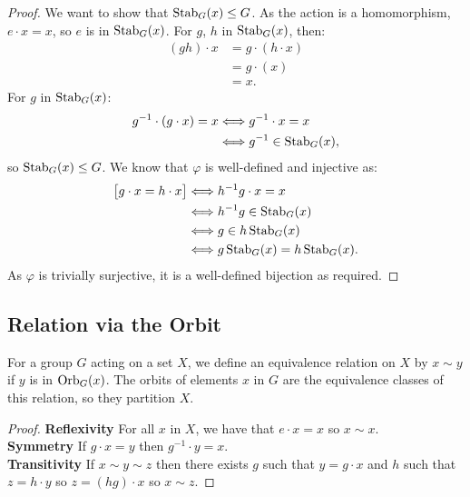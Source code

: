 \begin{proof}
    We want to show that $\operatorname{Stab}_G(x) \leq G$.
    As the action is a homomorphism, $e \cdot x = x$, so $e$ is
    in $\operatorname{Stab}_G(x)$. For $g$, $h$ in $\operatorname{Stab}_G(x)$, then: \begin{align*}
        (gh) \cdot x 
        &= g \cdot (h \cdot x) \tag{action is homomorphic} \\
        &= g \cdot (x) \\
        &= x.
    \end{align*} For $g$ in $\operatorname{Stab}_G(x)$: \begin{align*}
        g^{-1} \cdot (g \cdot x) = x
        & \Longleftrightarrow g^{-1} \cdot x = x \\
        & \Longleftrightarrow g^{-1} \in \operatorname{Stab}_G(x),
    \end{align*} so $\operatorname{Stab}_G(x) \leq G$. We know that
    $\varphi$ is well-defined and injective as: \begin{align*}
        \bigl[ g \cdot x = h \cdot x \bigr]
        & \Longleftrightarrow h^{-1}g \cdot x = x \\
        & \Longleftrightarrow h^{-1}g \in \operatorname{Stab}_G(x) \\
        & \Longleftrightarrow g \in h\operatorname{Stab}_G(x) \\
        & \Longleftrightarrow g\operatorname{Stab}_G(x) = h\operatorname{Stab}_G(x).
    \end{align*} As $\varphi$ is trivially surjective, it is a
    well-defined bijection as required.
\end{proof}

\subsection{Relation via the Orbit}

For a group $G$ acting on a set $X$, we define an equivalence relation
on $X$ by $x \sim y$ if $y$ is in $\operatorname{Orb}_G(x)$. The orbits of elements
$x$ in $G$ are the equivalence classes of this relation, so they 
partition $X$.

\begin{proof}
    \textbf{Reflexivity} For all $x$ in $X$, we have that
    $e \cdot x = x$ so $x \sim x$.
    \\[\baselineskip]
    \textbf{Symmetry} If $g \cdot x = y$ then $g^{-1} \cdot y = x$.
    \\[\baselineskip]
    \textbf{Transitivity} If $x \sim y \sim z$ then there exists
    $g$ such that $y = g \cdot x$ and $h$ such that $z = h \cdot y$
    so $z = (hg) \cdot x$ so $x \sim z$.
\end{proof}

